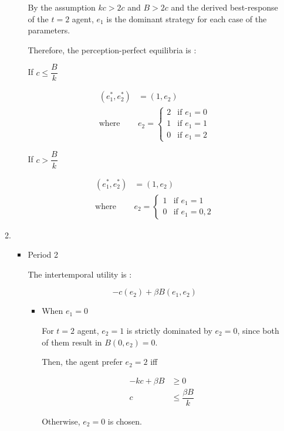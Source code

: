 \documentclass{jsarticle}
\begin{document}
\begin{enumerate}
\begin{enumerate}
\begin{itemize}
By the assumption $kc > 2c$ and $B>2c$ and the derived best-response of the $t=2$ agent, $e_1$ is the dominant strategy for each case of the parameters.

\newpage

Therefore, the perception-perfect equilibria is :

If $c \leq \dfrac{B}{k}$

\begin{align*}
(e_1^*, e_2^*) & = (1,e_2) \\
\text{where } & e_2=\begin{cases}
2 & \text{if } e_1=0 \\
1 & \text{if } e_1=1 \\
0 & \text{if } e_1=2
\end{cases}
\end{align*}

If $c > \dfrac{B}{k}$

\begin{align*}
(e_1^*, e_2^*) & = (1,e_2) \\
\text{where } & e_2=\begin{cases}
1 & \text{if } e_1=1 \\
0 & \text{if } e_1=0, 2
\end{cases}
\end{align*}

\end{itemize}

\item 

\begin{itemize}

\item Period 2

The intertemporal utility is :

\[ -c(e_2) + \beta B(e_1,e_2) \]

\begin{itemize}

\item When $e_1=0$

For $t=2$ agent, $e_2=1$ is strictly dominated by $e_2=0$, since both of them result in $B(0, e_2)=0$.

Then, the agent prefer $e_2=2$ iff

\begin{align*}
- kc + \beta B & \geq 0 \\
c & \leq \dfrac{\beta B}{k}
\end{align*}

Otherwise, $e_2=0$ is chosen.


\end{itemize}
\end{itemize}
\end{enumerate}
\end{enumerate}
\end{document}
